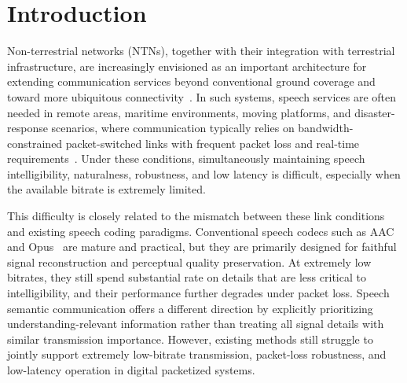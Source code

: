 \documentclass[conference]{IEEEtran}
\begin{document}
\section{Introduction}
Non-terrestrial networks (NTNs), together with their integration with terrestrial infrastructure, are increasingly envisioned as an important architecture for extending communication services beyond conventional ground coverage and toward more ubiquitous connectivity~\cite{3gpp_ntn,cheng2022sagin,ngmn_ntn}. In such systems, speech services are often needed in remote areas, maritime environments, moving platforms, and disaster-response scenarios, where communication typically relies on bandwidth-constrained packet-switched links with frequent packet loss and real-time requirements~\cite{guler2018semantic,xie2021deepsc}. Under these conditions, simultaneously maintaining speech intelligibility, naturalness, robustness, and low latency is difficult, especially when the available bitrate is extremely limited.

This difficulty is closely related to the mismatch between these link conditions and existing speech coding paradigms. Conventional speech codecs such as AAC and Opus~\cite{iso_aac,valin2012opus} are mature and practical, but they are primarily designed for faithful signal reconstruction and perceptual quality preservation. At extremely low bitrates, they still spend substantial rate on details that are less critical to intelligibility, and their performance further degrades under packet loss. Speech semantic communication offers a different direction by explicitly prioritizing understanding-relevant information rather than treating all signal details with similar transmission importance. However, existing methods still struggle to jointly support extremely low-bitrate transmission, packet-loss robustness, and low-latency operation in digital packetized systems.
\end{document}
